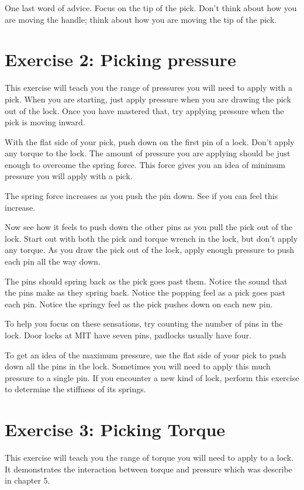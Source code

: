 One last word of advice. Focus on the tip of the pick. Don't think about how you are
moving the handle; think about how you are moving the tip of the pick.

\section{Exercise 2: Picking pressure}
This exercise will teach you the range of pressures you will need to apply with a pick. When
you are starting, just apply pressure when you are drawing the pick out of the lock. Once
you have mastered that, try applying pressure when the pick is moving inward.

With the flat side of your pick, push down on the first pin of a lock. Don't apply any
torque to the lock. The amount of pressure you are applying should be just enough to
overcome the spring force. This force gives you an idea of minimum pressure you will apply
with a pick.

The spring force increases as you push the pin down. See if you can feel this increase.

Now see how it feels to push down the other pins as you pull the pick out of the lock.
Start out with both the pick and torque wrench in the lock, but don't apply any torque. As
you draw the pick out of the lock, apply enough pressure to push each pin all the way down.

The pins should spring back as the pick goes past them. Notice the sound that the pins
make as they spring back. Notice the popping feel as a pick goes past each pin. Notice the
springy feel as the pick pushes down on each new pin.

To help you focus on these sensations, try counting the number of pins in the lock. Door
locks at MIT have seven pins, padlocks usually have four.

To get an idea of the maximum pressure, use the flat side of your pick to push down all
the pins in the lock. Sometimes you will need to apply this much pressure to a single pin.
If you encounter a new kind of lock, perform this exercise to determine the stiffness of its
springs.

\section{Exercise 3: Picking Torque}
This exercise will teach you the range of torque you will need to apply to a lock.
It demonstrates the interaction between torque and pressure which was describe in chapter 5.

